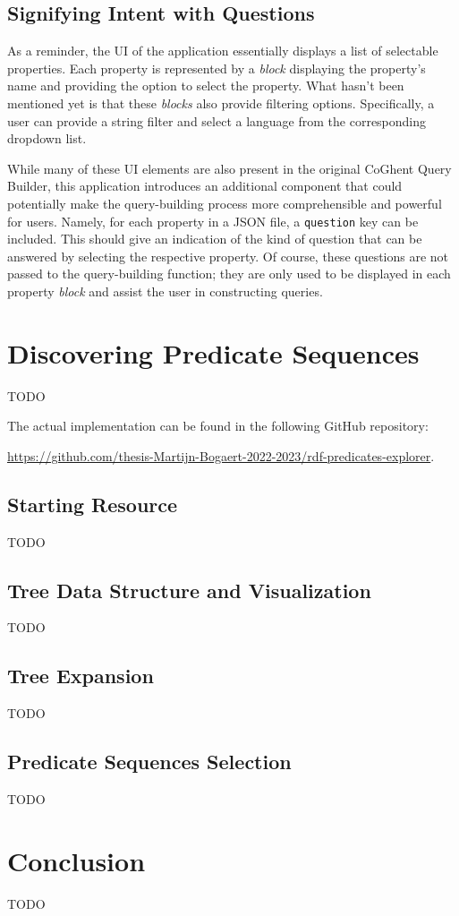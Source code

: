\subsection{Signifying Intent with Questions}

As a reminder, the UI of the application essentially displays a list of selectable properties. Each property is represented by a \textit{block} displaying the property's name and providing the option to select the property. What hasn't been mentioned yet is that these \textit{blocks} also provide filtering options. Specifically, a user can provide a string filter and select a language from the corresponding dropdown list.

While many of these UI elements are also present in the original CoGhent Query Builder, this application introduces an additional component that could potentially make the query-building process more comprehensible and powerful for users. Namely, for each property in a JSON file, a \texttt{question} key can be included. This should give an indication of the kind of question that can be answered by selecting the respective property. Of course, these questions are not passed to the query-building function; they are only used to be displayed in each property \textit{block} and assist the user in constructing queries.

\section{Discovering Predicate Sequences}
\label{sec:discovering_predicate_sequences}

TODO

The actual implementation can be found in the following GitHub repository:
\begin{center}
    \url{https://github.com/thesis-Martijn-Bogaert-2022-2023/rdf-predicates-explorer}.
\end{center}

\subsection{Starting Resource}

TODO

\subsection{Tree Data Structure and Visualization}

TODO

\subsection{Tree Expansion}

TODO

\subsection{Predicate Sequences Selection}

TODO

\section{Conclusion}

TODO